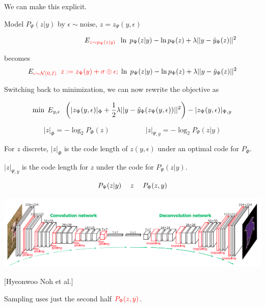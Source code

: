 {\vfill
We can make this explicit.

\vfill
Model $P_\Psi(z|y)$ by $\epsilon \sim \mathrm{noise}$, $z = z_\Psi(y,\epsilon)$

\vfill
{}
\bigskip
$$~\;\;\;\;\;\;\;\;\;\;\;\;\;\;\;\;\;\;\;\;\;\;\;\;\;\;\;\;E_{\color{red} z \sim p_\Psi(z|y)}\;\;\ln\;p_\Psi(z|y) - \ln p_\Phi(z) + \lambda||y-\hat{y}_\Phi(z)||^2$$

\bigskip
becomes
$$E_{\color{red} \epsilon \sim {\cal N}(0,I)}\;\;{\color{red} z := z_\Psi(y)+ \sigma \odot\epsilon;}\;\ln\;p_\Psi(z|y) - \ln p_\Phi(z) + \lambda||y-\hat{y}_\Phi(z)||^2$$


Switching back to minimization, we can now rewrite the objective as

\vfill
$$\min \; E_{y,\epsilon}\;\;\left(|z_\Psi(y,\epsilon)|_\Phi +  \frac{1}{2}\lambda||y - \hat{y}_\Phi(z_\Psi(y,\epsilon))||^2\right) - |z_\Psi(y,\epsilon)|_{\Psi,y}$$

\vfill
$$|z|_\Phi  = - \log_2 P_\Phi(z)\hspace{5em} |z|_{\Psi,y}  = - \log_2 P_\Psi(z|y)$$

\vfill
For $z$ discrete, $|z|_\Phi$ is the code length of $z(y,\epsilon)$ under an optimal code for $P_\Phi$.

\vfill
$|z|_{\Psi,y}$ is the code length for $z$ under the code for $P_\Psi(z|y)$.


$$P_\Psi(z|y) \hspace{3ex} z \hspace{3ex}  P_\Phi(z,y)$$

\centerline{\includegraphics[width=6in]{../images/Deconv}}
\centerline{\large [Hyeonwoo Noh et al.]}

\vfill
Sampling uses just the second half ${\color{red} P_\Phi(z,y)}$.


}
